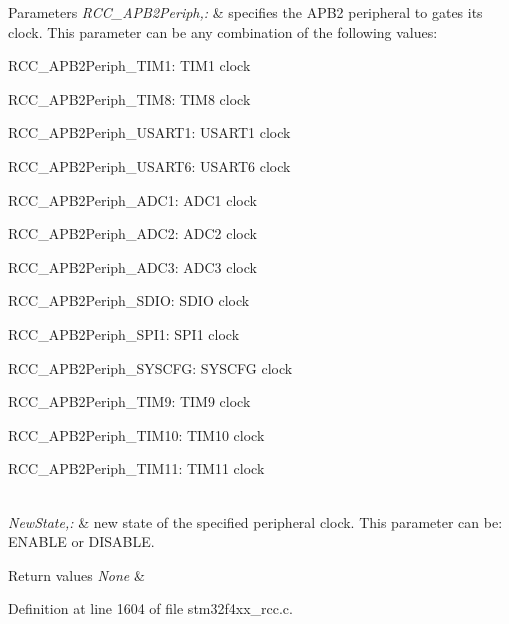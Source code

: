 \begin{DoxyParams}{Parameters}
{\em R\-C\-C\-\_\-\-A\-P\-B2\-Periph,\-:} & specifies the A\-P\-B2 peripheral to gates its clock. This parameter can be any combination of the following values\-: \begin{DoxyItemize}
\item R\-C\-C\-\_\-\-A\-P\-B2\-Periph\-\_\-\-T\-I\-M1\-: T\-I\-M1 clock \item R\-C\-C\-\_\-\-A\-P\-B2\-Periph\-\_\-\-T\-I\-M8\-: T\-I\-M8 clock \item R\-C\-C\-\_\-\-A\-P\-B2\-Periph\-\_\-\-U\-S\-A\-R\-T1\-: U\-S\-A\-R\-T1 clock \item R\-C\-C\-\_\-\-A\-P\-B2\-Periph\-\_\-\-U\-S\-A\-R\-T6\-: U\-S\-A\-R\-T6 clock \item R\-C\-C\-\_\-\-A\-P\-B2\-Periph\-\_\-\-A\-D\-C1\-: A\-D\-C1 clock \item R\-C\-C\-\_\-\-A\-P\-B2\-Periph\-\_\-\-A\-D\-C2\-: A\-D\-C2 clock \item R\-C\-C\-\_\-\-A\-P\-B2\-Periph\-\_\-\-A\-D\-C3\-: A\-D\-C3 clock \item R\-C\-C\-\_\-\-A\-P\-B2\-Periph\-\_\-\-S\-D\-I\-O\-: S\-D\-I\-O clock \item R\-C\-C\-\_\-\-A\-P\-B2\-Periph\-\_\-\-S\-P\-I1\-: S\-P\-I1 clock \item R\-C\-C\-\_\-\-A\-P\-B2\-Periph\-\_\-\-S\-Y\-S\-C\-F\-G\-: S\-Y\-S\-C\-F\-G clock \item R\-C\-C\-\_\-\-A\-P\-B2\-Periph\-\_\-\-T\-I\-M9\-: T\-I\-M9 clock \item R\-C\-C\-\_\-\-A\-P\-B2\-Periph\-\_\-\-T\-I\-M10\-: T\-I\-M10 clock \item R\-C\-C\-\_\-\-A\-P\-B2\-Periph\-\_\-\-T\-I\-M11\-: T\-I\-M11 clock \end{DoxyItemize}
\\
\hline
{\em New\-State,\-:} & new state of the specified peripheral clock. This parameter can be\-: E\-N\-A\-B\-L\-E or D\-I\-S\-A\-B\-L\-E. \\
\hline
\end{DoxyParams}

\begin{DoxyRetVals}{Return values}
{\em None} & \\
\hline
\end{DoxyRetVals}


Definition at line 1604 of file stm32f4xx\-\_\-rcc.\-c.

